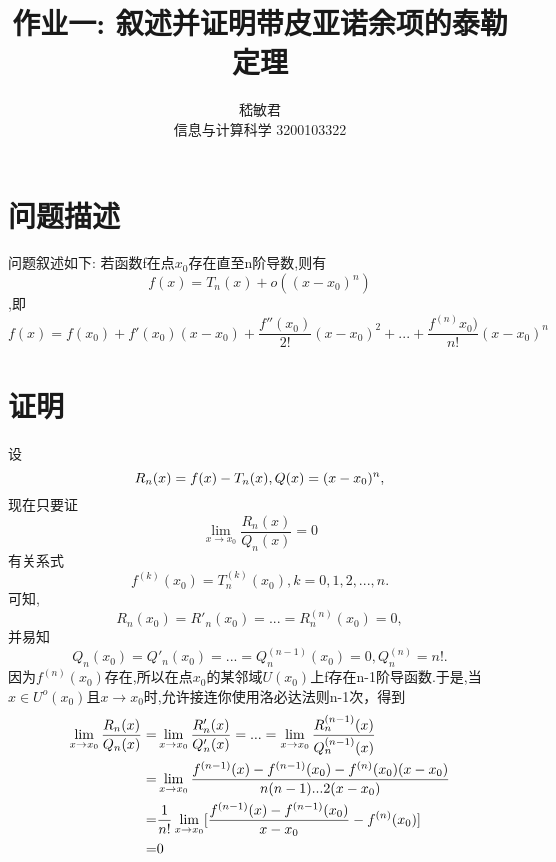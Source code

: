 \documentclass{ctexart}
\title{作业一: 叙述并证明带皮亚诺余项的泰勒定理}
\author{嵇敏君 \\信息与计算科学 3200103322 }
\begin{document}
\maketitle


\section{问题描述}
问题叙述如下: 若函数f在点$x_0$存在直至n阶导数,则有
\begin{equation}
  f(x)=T_n(x)+o((x-x_0)^n)\label{pythagorean}
\end{equation}
,即
\begin{equation}
  f(x)=f(x_0)+f'(x_0)(x-x_0)+\frac{f''(x_0)}{2!}(x-x_0)^2+...+\frac{f^{(n)}x_0)}{n!}(x-x_0)^n\label{pythagorean}
\end{equation}


\section{证明}
设
\begin{equation}
  R_n(x)=f(x)-T_n(x),Q(x)=(x-x_0)^n,\notag
\end{equation}
现在只要证
\begin{equation}
  \lim_{x \rightarrow x_0}\frac{R_n(x)}{Q_n(x)}=0\label{pythagorean}
\end{equation}
有关系式
\begin{equation}
  f^{(k)}(x_0)=T^{(k)}_n(x_0),k=0,1,2,...,n.\label{pythagorean}
\end{equation}
可知,
\begin{equation}
  R_n(x_0)=R'_n(x_0)=...=R^{(n)}_n(x_0)=0,\label{pythagorean}
\end{equation}
并易知
\begin{equation}
  Q_n(x_0)=Q'_n(x_0)=...=Q^{(n-1)}_n(x_0)=0,Q^{(n)}_n=n!.\label{pythagorean}
\end{equation}
因为$f^{(n)}(x_0)$存在,所以在点$x_0$的某邻域$U(x_0)$上f存在n-1阶导函数.于是,当$x \in U^o(x_0)$且$x \rightarrow x_0$时,允许接连你使用洛必达法则n-1次，得到
\begin{align}
  \lim_{x \rightarrow x_0}\frac{R_n(x)}{Q_n(x)} = & \lim_{x \rightarrow x_0}\frac{R'_n(x)}{Q'_n(x)}=...=\lim_{x \rightarrow x_0}\frac{R^{(n-1)}_n(x)}{Q^{(n-1)}_n(x)} \notag \\
= & \lim_{x \rightarrow x_0}\frac{f^{(n-1)}(x)-f^{(n-1)}(x_0)-f^{(n)}(x_0)(x-x_0)}{n(n-1)...2(x-x_0)} \notag \\
= & \frac{1}{n!}\lim_{x \rightarrow x_0}[\frac{f^{(n-1)}(x)-f^{(n-1)}(x_0)}{x-x_0}-f^{(n)}(x_0)] \notag \\
= & 0 \notag
\end{align}
\end{document}
